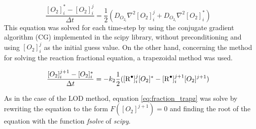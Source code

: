 \documentclass[twoside,11pt]{report}
\newcounter{reaction}
\begin{document}
\begin{equation}
    \frac{[O_2]_i^*-[O_2]_i^j}{\Delta t} = \frac{1}{2}(D_{O_{2_i}}\nabla^2[O_2]_i^j + D_{O_{2_i}}\nabla^2[O_2]_i^*)
    \label{eq:fraction_CN}
\end{equation}
This equation was solved for each time-step by using the conjugate gradient algorithm (CG) implemented in the scipy library, without preconditioning and using $[O_2]_i^j$ as the initial guess value. On the other hand, concerning the method for solving the reaction fractional equation, a trapezoidal method was used.

\begin{equation}
    \frac{[O_2]_i^{j+1}-[O_2]_i^*}{\Delta t}= -k_2 \frac{1}{2}([\ce{R^.}]_i^j[O_2]^*-[\ce{R^.}]_i^{j+1}[O_2]^{j+1}) \label{eq:fraction_trapz}
\end{equation}

As in the case of the LOD method, equation \ref{eq:fraction_trapz} was solve by rewriting the equation to the form $F([O_2]^{j+1})=0$ and finding the root of the equation with the function \textit{fsolve} of \textit{scipy}. 
\end{document}
